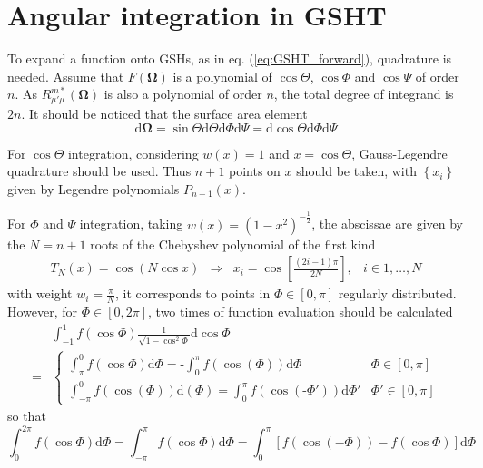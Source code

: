 \section{Angular integration in GSHT}

To expand a function onto GSHs, as in eq. (\ref{eq:GSHT_forward}),
quadrature is needed. Assume that $F(\mathbf{\Omega})$ is a polynomial
of $\cos\Theta$, $\cos\Phi$ and $\cos\Psi$ of order $n$. As $R_{\mu'\mu}^{m*}(\mathbf{\Omega})$
is also a polynomial of order $n$, the total degree of integrand
is $2n$. It should be noticed that the surface area element
\begin{equation}
\mathrm{d}\mathbf{\Omega}=\sin\Theta\mathrm{d}\Theta\mathrm{d}\Phi\mathrm{d}\Psi=\mathrm{d}\cos\Theta\mathrm{d}\Phi\mathrm{d}\Psi
\end{equation}


For $\cos\Theta$ integration, considering $w(x)=1$ and $x=\cos\Theta$,
Gauss-Legendre quadrature should be used. Thus $n+1$ points on $x$
should be taken, with $\left\{ x_{i}\right\} $ given by Legendre
polynomials $P_{n+1}(x).$

For $\Phi$ and $\Psi$ integration, taking $w(x)=\left(1-x^{2}\right)^{-\frac{1}{2}}$,
the abscissae are given by the $N=n+1$ roots of the Chebyshev polynomial
of the first kind
\begin{equation}
\begin{array}{cccc}
T_{N}(x)=\cos(N\cos x) & \Rightarrow & x_{i}=\cos\left[\frac{(2i-1)\pi}{2N}\right], & i\in1,\ldots,N\end{array}
\end{equation}
 with weight $w_{i}=\frac{\pi}{N}$, it corresponds to points in $\Phi\in\left[0,\pi\right]$
regularly distributed. However, for $\Phi\in\left[0,2\pi\right]$,
two times of function evaluation should be calculated
\begin{align}
 & \int_{-1}^{1}f(\cos\Phi)\frac{1}{\sqrt{1-\cos^{2}\Phi}}\mathrm{d}\cos\Phi\nonumber \\
= & \begin{cases}
\int_{\pi}^{0}f(\cos\Phi)\mathrm{d}\Phi=\text{-}\int_{0}^{\pi}f(\cos(\Phi))\mathrm{d}\Phi & \Phi\in[0,\pi]\\
\int_{-\pi}^{0}f(\cos(\Phi))\mathrm{d}(\Phi)=\int_{0}^{\pi}f(\cos(\text{-}\Phi'))\mathrm{d}\Phi' & \Phi'\in[0,\pi]
\end{cases}
\end{align}
so that
\begin{equation}
\int_{0}^{2\pi}f(\cos\Phi)\mathrm{d}\Phi=\int_{-\pi}^{\pi}f(\cos\Phi)\mathrm{d}\Phi=\int_{0}^{\pi}\left[f(\cos(-\Phi))-f(\cos\Phi)\right]\mathrm{d}\Phi
\end{equation}


